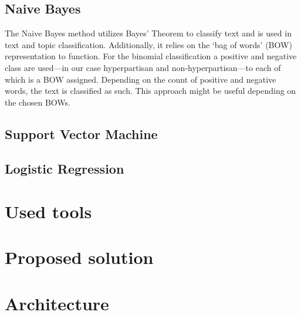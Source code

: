 \documentclass{article}
\begin{document}
\subsection{Naive Bayes}
The Naive Bayes method utilizes Bayes' Theorem to classify text and is used in text and topic classification.
Additionally, it relies on the `bag of words' (BOW) representation to function.
For the binomial classification a positive and negative class are used---in our case hyperpartisan and non-hyperpartisan---to each of which is a BOW assigned.
Depending on the count of positive and negative words, the text is classified as such.
This approach might be useful depending on the chosen BOWs.
\subsection{Support Vector Machine}
\subsection{Logistic Regression}

\section{Used tools}

\section{Proposed solution}

\section{Architecture}
\end{document}
